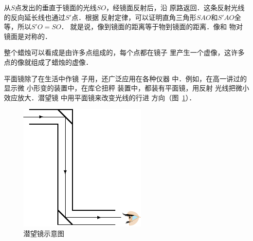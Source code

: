     从$S$点发出的垂直于镜面的光线$SO$，经镜面反射后，沿
    原路返回．这条反射光线的反向延长线也通过$S'$点．根据
    反射定律，可以证明直角三角形$SAO$和$S'AO$全等，所以$S'O=SO$．
    就是说，像到镜面的距离等于物到镜面的距离．像和
    物对镜面是对称的．

    整个蜡烛可以看成是由许多点组成的，每个点都在镜子
    里产生一个虚像，这许多点的像就组成了蜡烛的虚像．

    平面镜除了在生活中作镜
    子用，还广泛应用在各种仪器
    中．例如，在高一讲过的显示微
    小形变的装置中，在库仑扭秤
    装置中，都装有平面镜，用反射
    光线把微小效应放大．潜望镜
    中用平面镜来改变光线的行进
    方向（图~\ref{fig_C_5-11}）．
    \begin{figure}[htbp]
        \centering
        \includegraphics{fig/C/5-11.pdf}
        \caption{潜望镜示意图}\label{fig_C_5-11}
    \end{figure}

